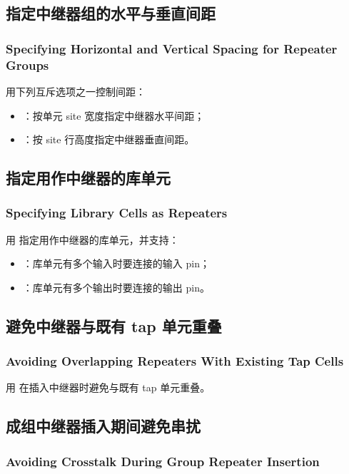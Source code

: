\subsection{指定中继器组的水平与垂直间距}
\subsubsection*{Specifying Horizontal and Vertical Spacing for Repeater Groups}

用下列互斥选项之一控制间距：
\begin{itemize}
  \item {}：按单元 site 宽度指定中继器水平间距；
  \item {}：按 site 行高度指定中继器垂直间距。
\end{itemize}

\subsection{指定用作中继器的库单元}
\subsubsection*{Specifying Library Cells as Repeaters}

用  指定用作中继器的库单元，并支持：
\begin{itemize}
  \item {}：库单元有多个输入时要连接的输入 pin；
  \item {}：库单元有多个输出时要连接的输出 pin。
\end{itemize}

\subsection{避免中继器与既有 tap 单元重叠}
\subsubsection*{Avoiding Overlapping Repeaters With Existing Tap Cells}

用  在插入中继器时避免与既有 tap 单元重叠。

\subsection{成组中继器插入期间避免串扰}
\subsubsection*{Avoiding Crosstalk During Group Repeater Insertion}

